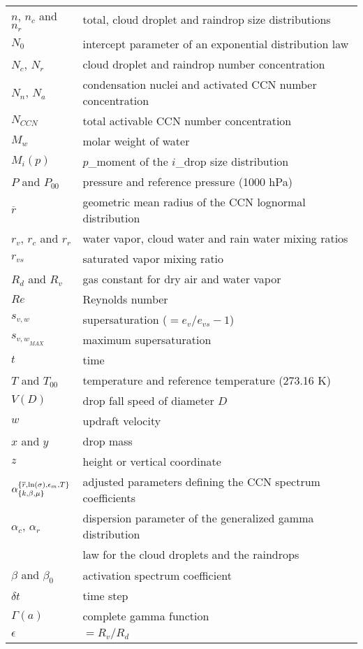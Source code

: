 \begin{longtable}{ll}
$n$, $n_c$ and $n_r$&total, cloud droplet and raindrop size distributions\\
$N_0$&intercept parameter of an exponential distribution law\\
$N_c$, $N_r$&cloud droplet and raindrop number concentration\\
$N_n$, $N_a$&condensation nuclei and activated CCN number concentration\\
$N_{CCN}$&total activable CCN number concentration\\
$M_w$&molar weight of water\\
$M_i(p)$&$p$\_moment of the $i$\_drop size distribution\\
$P$ and $P_{00}$&pressure and reference pressure (1000 hPa)\\
$\overline{r}$&geometric mean radius of the CCN lognormal distribution\\
$r_v$, $r_c$ and $r_r$&water vapor, cloud water and rain water mixing ratios\\
$r_{vs}$&saturated vapor mixing ratio\\
$R_d$ and $R_v$&gas constant for dry air and water vapor\\
$Re$&Reynolds number\\
$s_{v,w}$&supersaturation ($=e_v/e_{vs}-1$)\\
$s_{{v,w}_{MAX}}$&maximum supersaturation\\
$t$&time\\
$T$ and $T_{00}$&temperature and reference temperature (273.16 K)\\
$V(D)$&drop fall speed of diameter $D$\\
$w$&updraft velocity\\
$x$ and $y$&drop mass\\
$z$&height or vertical coordinate\\
$\alpha_{\{k, \beta, \mu\}}^{\{{\overline r}, {\rm ln}(\sigma), \epsilon_m, T\}}$&adjusted parameters defining the CCN spectrum coefficients\\
$\alpha_c$, $\alpha_r$&dispersion parameter of the generalized gamma distribution\\
                      &law for the cloud droplets and the raindrops\\
$\beta$ and ${\beta}_0$&activation spectrum coefficient\\
$\delta t$&time step\\
$\Gamma(a)$&complete gamma function\\
$\epsilon$&$=R_v/R_d$\\

\end{longtable}
